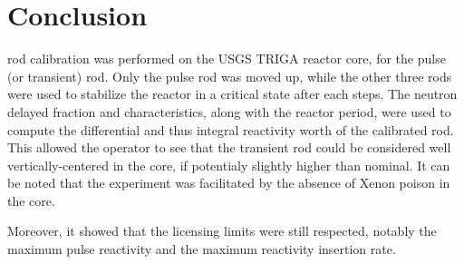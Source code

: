 %
%
\let\textcircled=\pgftextcircled
\chapter{Conclusion}
\label{chap:conclusion}

 rod calibration was performed on the USGS TRIGA reactor core, for the pulse (or transient) rod. Only the pulse rod was moved up, while the other three rods were used to stabilize the reactor in a critical state after each steps. The neutron delayed fraction and characteristics, along with the reactor period, were used to compute the differential and thus integral reactivity worth of the calibrated rod. This allowed the operator to see that the transient rod could be considered well vertically-centered in the core, if potentialy slightly higher than nominal. It can be noted that the experiment was facilitated by the absence of Xenon poison in the core.

Moreover, it showed that the licensing limits were still respected, notably the maximum pulse reactivity and the maximum reactivity insertion rate.



